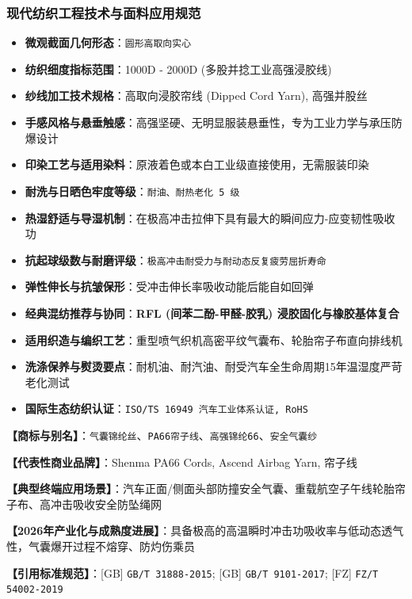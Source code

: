\documentclass[11pt,openright,twoside,UTF8]{ctexbook}
\begin{document}
\subsubsection*{现代纺织工程技术与面料应用规范}
\begin{itemize} \setlength{\itemsep}{2pt}
    \item \textbf{微观截面几何形态}：\texttt{圆形高取向实心}
    \item \textbf{纺织细度指标范围}：1000D - 2000D (多股并捻工业高强浸胶线)
    \item \textbf{纱线加工技术规格}：高取向浸胶帘线 (Dipped Cord Yarn), 高强并股丝
    \item \textbf{手感风格与悬垂触感}：高强坚硬、无明显服装悬垂性，专为工业力学与承压防爆设计
    \item \textbf{印染工艺与适用染料}：原液着色或本白工业级直接使用，无需服装印染
    \item \textbf{耐洗与日晒色牢度等级}：\texttt{耐油、耐热老化 5 级}
    \item \textbf{热湿舒适与导湿机制}：在极高冲击拉伸下具有最大的瞬间应力-应变韧性吸收功
    \item \textbf{抗起球级数与耐磨评级}：\texttt{极高冲击耐受力与耐动态反复疲劳屈折寿命}
    \item \textbf{弹性伸长与抗皱保形}：受冲击伸长率吸收动能后能自如回弹
    \item \textbf{经典混纺推荐与协同}：\textbf{RFL (间苯二酚-甲醛-胶乳) 浸胶固化与橡胶基体复合}
    \item \textbf{适用织造与编织工艺}：重型喷气织机高密平纹气囊布、轮胎帘子布直向排线机
    \item \textbf{洗涤保养与熨烫要点}：耐机油、耐汽油、耐受汽车全生命周期15年温湿度严苛老化测试
    \item \textbf{国际生态纺织认证}：\texttt{ISO/TS 16949 汽车工业体系认证, RoHS}
\end{itemize}
\vspace{0.2cm}

\noindent\textbf{【商标与别名】}：\texttt{气囊锦纶丝}、\texttt{PA66帘子线}、\texttt{高强锦纶66}、\texttt{安全气囊纱}\par
\noindent\textbf{【代表性商业品牌】}：Shenma PA66 Cords, Ascend Airbag Yarn, 帘子线\par
\noindent\textbf{【典型终端应用场景】}：汽车正面/侧面头部防撞安全气囊、重载航空子午线轮胎帘子布、高冲击吸收安全防坠绳网\par
\noindent\textbf{【2026年产业化与成熟度进展】}：具备极高的高温瞬时冲击功吸收率与低动态透气性，气囊爆开过程不熔穿、防灼伤乘员\par
\noindent\textbf{【引用标准规范】}：[GB] \texttt{GB/T 31888-2015}; [GB] \texttt{GB/T 9101-2017}; [FZ] \texttt{FZ/T 54002-2019}\par
\vspace{0.5cm}
\end{document}
